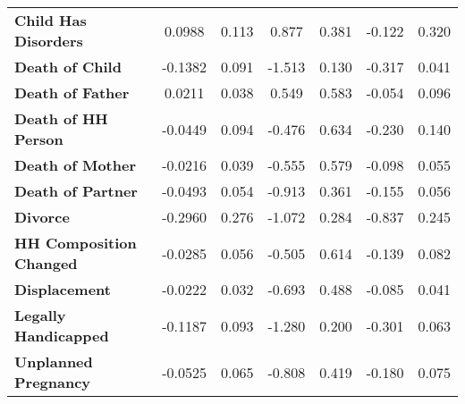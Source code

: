 \begin{center}
\begin{tabular}{lcccccc}
 \textbf{Child Has Disorders}                                                                           &       0.0988  &        0.113     &     0.877  &         0.381        &       -0.122    &        0.320     \\
 \textbf{Death of Child}                                                                              &      -0.1382  &        0.091     &    -1.513  &         0.130        &       -0.317    &        0.041     \\
 \textbf{Death of Father}                                                                             &       0.0211  &        0.038     &     0.549  &         0.583        &       -0.054    &        0.096     \\
 \textbf{Death of HH Person}                                                                         &      -0.0449  &        0.094     &    -0.476  &         0.634        &       -0.230    &        0.140     \\
 \textbf{Death of Mother}                                                                             &      -0.0216  &        0.039     &    -0.555  &         0.579        &       -0.098    &        0.055     \\
 \textbf{Death of Partner}                                                                            &      -0.0493  &        0.054     &    -0.913  &         0.361        &       -0.155    &        0.056     \\
 \textbf{Divorce}                                                                                  &      -0.2960  &        0.276     &    -1.072  &         0.284        &       -0.837    &        0.245     \\
 \textbf{HH Composition Changed}                                                                          &      -0.0285  &        0.056     &    -0.505  &         0.614        &       -0.139    &        0.082     \\
 \textbf{Displacement}                                                                          &      -0.0222  &        0.032     &    -0.693  &         0.488        &       -0.085    &        0.041     \\
 \textbf{Legally Handicapped}                                                                &      -0.1187  &        0.093     &    -1.280  &         0.200        &       -0.301    &        0.063     \\
 \textbf{Unplanned Pregnancy}                                                                      &      -0.0525  &        0.065     &    -0.808  &         0.419        &       -0.180    &        0.075     \\

\end{tabular}
\end{center}
